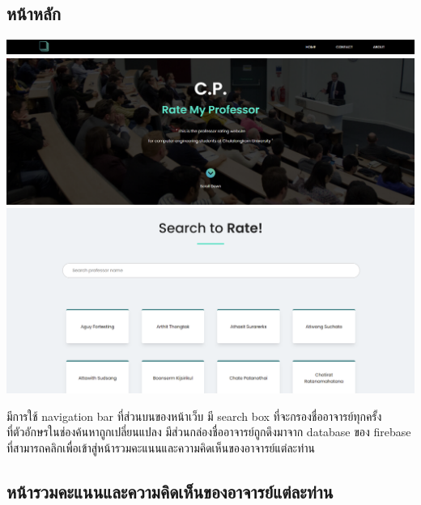 \documentclass[17pt]{extarticle}
\begin{document}
\subsection{หน้าหลัก}
\begin{center}
    \includegraphics[scale=0.4]{topbar.png}\\
    \includegraphics[scale=0.4]{frontpage.png}\\
    \includegraphics[scale=0.4]{proflist.png}
\end{center}
\par มีการใช้ navigation bar ที่ส่วนบนของหน้าเว็บ มี search box ที่จะกรองชื่ออาจารย์ทุกครั้ง\\
ที่ตัวอักษรในช่องค้นหาถูกเปลี่ยนแปลง มีส่วนกล่องชื่ออาจารย์ถูกดึงมาจาก database ของ firebase
ที่สามารถคลิกเพื่อเข้าสู่หน้ารวมคะแนนและความคิดเห็นของอาจารย์แต่ละท่าน

\subsection{หน้ารวมคะแนนและความคิดเห็นของอาจารย์แต่ละท่าน}
\end{document}

